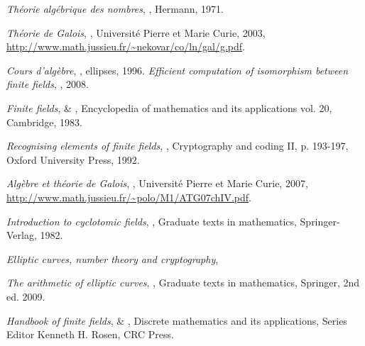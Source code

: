 \documentclass[a4paper]{article} %
\numberwithin{equation}{section}
\begin{document}
\begin{thebibliography}{LC}
 \emph{Théorie algébrique des nombres}, , 
Hermann, 1971.

 \emph{Théorie de Galois}, , Université 
Pierre et Marie Curie, 2003,  
\url{http://www.math.jussieu.fr/~nekovar/co/ln/gal/g.pdf}.

 \emph{Cours d'algèbre}, , ellipses, 1996.
 \emph{Efficient computation of isomorphism between finite fields},
, 2008.

 \emph{Finite fields},  \& 
, Encyclopedia of mathematics and its applications vol.
20, Cambridge, 1983.

 \emph{Recognising elements of finite fields}, , Cryptography and coding II, p. 193-197, Oxford University Press, 1992.

 \emph{Algèbre et théorie de Galois}, , 
Université Pierre et Marie Curie, 2007,  
\url{http://www.math.jussieu.fr/~polo/M1/ATG07chIV.pdf}.

 \emph{Introduction to cyclotomic fields}, , Graduate texts in mathematics, Springer-Verlag, 1982.

 \emph{Elliptic curves, number theory and cryptography},

 \emph{The arithmetic of elliptic curves}, 
, Graduate texts in mathematics, Springer, 2nd ed. 
2009.

 \emph{Handbook of finite fields},  \& 
, Discrete mathematics and its applications, Series Editor 
Kenneth H. Rosen, CRC Press.
\end{thebibliography}
\end{document}
